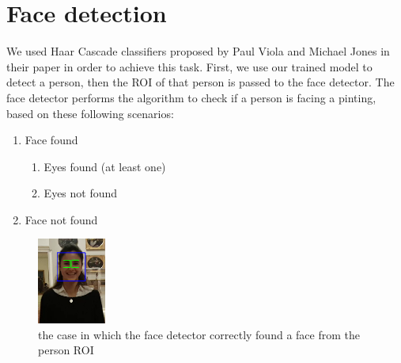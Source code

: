 \section{Face detection}
We used Haar Cascade classifiers proposed by Paul Viola and Michael Jones in their paper \cite{haar_cascade} in order to achieve this task. First, we use our trained model to detect a person, then the ROI of that person is passed to the face detector. The face detector performs the algorithm to check if a person is facing a pinting, based on these following scenarios:
\begin{enumerate}[label=\alph*)]
	\item Face found
    \begin{enumerate}[label=(\roman*)]
        \item \label{Eyes found} Eyes found (at least one)
        \item \label{Eyes not found} Eyes not found 
    \end{enumerate}
	\item \label{Face not found} Face not found
\end{enumerate}

\begin{figure}
    \centering
        \includegraphics[width=0.2\textwidth]{pictures/face_detection/face_det2}
    \caption{the case in which the face detector correctly found a face from the person ROI}
    \label{fig:Eyes}
\end{figure}

